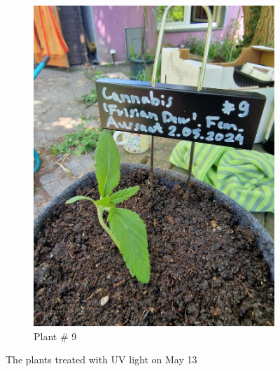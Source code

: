 \begin{figure}[htbp]
\begin{subfigure}[t]{.19\textwidth}
        \includegraphics[width=\linewidth]{plant_09_2024-05-13}
        \caption{Plant \# 9}
        \label{fig:plant_09_2024-05-13}
    \end{subfigure}
    \caption[Plants of the UV group on May 13]{The plants treated with UV light on May 13}
    \label{fig:plants_uv_2024-05-13}
\end{figure}

